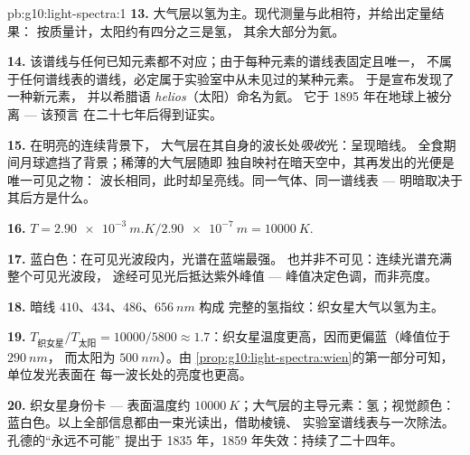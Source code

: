 \begin{solution}{pb:g10:light-spectra:1}
\textbf{13.} 大气层以氢为主。现代测量与此相符，并给出定量结果：
按质量计，太阳约有四分之三是氢，
其余大部分为氦。

\textbf{14.} 该谱线与任何已知元素都不对应；由于每种元素的谱线表固定且唯一，
不属于任何谱线表的谱线，必定属于实验室中从未见过的某种元素。
于是宣布发现了一种新元素，
并以希腊语 \emph{helios}（太阳）命名为氦。
它于 1895 年在地球上被分离 --- 该预言
在二十七年后得到证实。

\textbf{15.} 在明亮的连续背景下，
大气层在其自身的波长处\emph{吸收}光：呈现暗线。
全食期间月球遮挡了背景；稀薄的大气层随即
独自映衬在暗天空中，其再发出的光便是唯一可见之物：
波长相同，此时却呈亮线。同一气体、同一谱线表
--- 明暗取决于其后方是什么。

\textbf{16.} $T = \qty{2.90e-3}{m.K} / \qty{2.90e-7}{m}
= \qty{10000}{K}$.

\textbf{17.} 蓝白色：在可见光波段内，光谱在蓝端最强。
也并非不可见：连续光谱充满整个可见光波段，
途经可见光后抵达紫外峰值 ---
峰值决定色调，而非亮度。

\textbf{18.} 暗线 $410$、$434$、$486$、$\qty{656}{nm}$ 构成
完整的氢指纹：织女星大气以氢为主。

\textbf{19.} $T_{\text{织女星}} / T_{\text{太阳}} = 10000 / 5800 \approx
1.7$：织女星温度更高，因而更偏蓝（峰值位于 $\qty{290}{nm}$，
而太阳为 $\qty{500}{nm}$）。由
\cref{prop:g10:light-spectra:wien}的第一部分可知，单位发光表面在
每一波长处的亮度也更高。

\textbf{20.} 织女星身份卡 --- 表面温度约
$\qty{10000}{K}$；大气层的主导元素：氢；视觉颜色：
蓝白色。以上全部信息都由一束光读出，借助棱镜、
实验室谱线表与一次除法。孔德的“永远不可能”
提出于 1835 年，1859 年失效：持续了二十四年。
\end{solution}
